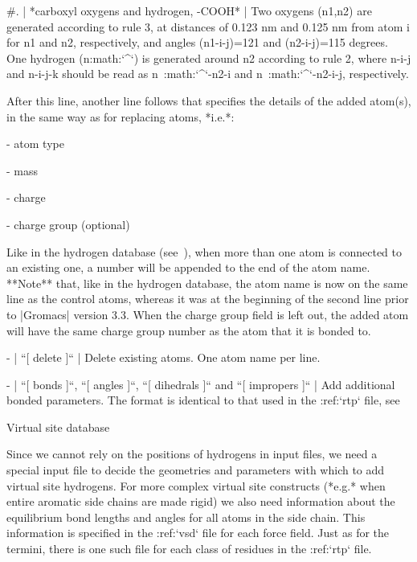    #. | *carboxyl oxygens and hydrogen, -COOH*
      | Two oxygens (n1,n2) are generated according to rule 3, at
        distances of 0.123 nm and 0.125 nm from atom i for n1 and n2,
        respectively, and angles (n1-i-j)=121 and (n2-i-j)=115 degrees.
        One hydrogen (n:math:`^\prime`) is generated around n2 according
        to rule 2, where n-i-j and n-i-j-k should be read as
        n\ :math:`^\prime`-n2-i and n\ :math:`^\prime`-n2-i-j,
        respectively.

   After this line, another line follows that specifies the details of
   the added atom(s), in the same way as for replacing atoms, *i.e.*:

   -  atom type

   -  mass

   -  charge

   -  charge group (optional)

   Like in the hydrogen database (see ),
   when more than one atom is connected to an existing one, a number
   will be appended to the end of the atom name. **Note** that, like in
   the hydrogen database, the atom name is now on the same line as the
   control atoms, whereas it was at the beginning of the second line
   prior to |Gromacs| version 3.3. When the charge group field is left
   out, the added atom will have the same charge group number as the
   atom that it is bonded to.

-  | ``[ delete ]``
   | Delete existing atoms. One atom name per line.

-  | ``[ bonds ]``, ``[ angles ]``,
     ``[ dihedrals ]`` and ``[ impropers ]``
   | Add additional bonded parameters. The format is identical to that
     used in the :ref:`rtp` file,
     see 

Virtual site database
~~~~~~~~~~~~~~~~~~~~~

Since we cannot rely on the positions of hydrogens in input files, we
need a special input file to decide the geometries and parameters with
which to add virtual site hydrogens. For more complex virtual site
constructs (*e.g.* when entire aromatic side chains are made rigid) we
also need information about the equilibrium bond lengths and angles for
all atoms in the side chain. This information is specified in the
:ref:`vsd` file for each force field. Just as for the termini,
there is one such file for each class of residues in the
:ref:`rtp` file.

